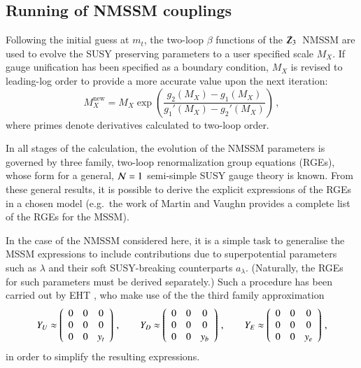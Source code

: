 \documentclass[final,3p,times,pdflatex]{elsarticle}
\newcommand{\Zv}{{\mbox{$\slashed{Z}_{3}$}\ }} %
\begin{document}
\subsection{Running of NMSSM couplings~\label{running}}
Following the initial guess at $m_t$, the two-loop $\beta$ functions of the 
$\Zv$ NMSSM are used to evolve the SUSY preserving parameters to a user 
specified scale $M_X$. If gauge unification has been specified as a boundary 
condition, $M_X$ is revised to leading-log order to provide a more accurate 
value upon the next iteration:
%
\begin{equation}
M_X^{\textrm{new}} = M_X \exp 
\left({\frac{g_2(M_X) - g_1(M_X)}{g_1'(M_X) - g_2'(M_X)}}\right)\,,
\label{mguteq}
\end{equation}
%
where primes denote derivatives calculated to two-loop order.   

In all stages of the calculation, the evolution of the NMSSM parameters is 
governed by three family, two-loop renormalization group equations (RGEs), whose
 form \cite{MV94,Yam94} for a general, ${\cal N}=1$ semi-simple SUSY gauge 
theory is known. From these general results, it is possible to derive the 
explicit expressions of the RGEs in a chosen model (e.g.\ the work of Martin and
 Vaughn \cite{MV94} provides a complete list of the RGEs for the MSSM).  

In the case of the NMSSM considered here, it is a simple task to generalise the 
MSSM expressions \cite{MV94} to include contributions due to superpotential 
parameters such as $\lambda$ and their soft SUSY-breaking counterparts 
$a_\lambda$.  (Naturally, the RGEs for such parameters must be derived 
separately.)  Such a procedure has been carried out by EHT \cite{Ellwanger:2009dp}, who make use of the 
the third family approximation
%
\begin{equation}
Y_U \approx \left(\begin{array}{c c c} 
0 & 0 & 0 \\
0 & 0 & 0 \\
0 & 0 & y_t 
\end{array}\right) \,, \qquad
%
Y_D \approx \left(\begin{array}{c c c} 
0 & 0 & 0 \\
0 & 0 & 0 \\
0 & 0 & y_b 
\end{array}\right) \,, \qquad
%
Y_E \approx \left(\begin{array}{c c c} 
0 & 0 & 0 \\
0 & 0 & 0 \\
0 & 0 & y_e 
\end{array}\right)\,,
\label{eq:3rd fam} 
\end{equation}
%
in order to simplify the resulting expressions.
\end{document}
